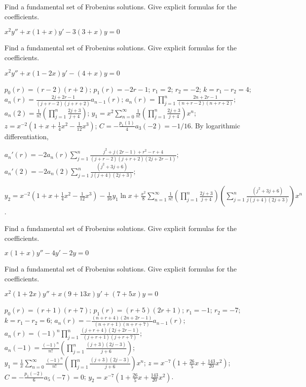 \documentclass{ximera}
\begin{document}
\begin{problem}\label{exer:7.7.11}
Find
a fundamental set  of Frobenius solutions. Give explicit formulas for
the coefficients.

$x^2y''+x(1+x)y'-3(3+x)y=0$
\end{problem}

\begin{problem}\label{exer:7.7.12}
Find
a fundamental set  of Frobenius solutions. Give explicit formulas for
the coefficients.

$x^2y''+x(1-2x)y'-(4+x)y=0$
\begin{solution}
    $p_0(r)=(r-2)(r+2)$;
$p_1(r)=-2r-1$;
$r_1=2$; $r_2=-2$; $k=r_1-r_2=4$;
$a_n(r)=\frac{2j+2r-1}{(j+r-2)(j+r+2)}
a_{n-1}(r)$;
 $a_n(r)=\prod_{j=1}^n\frac{2n+2r-1}{(n+r-2)(n+r+2)}$;
$a_n(2)=\frac{1}{ n!}\left(\prod_{j=1}^n\frac{2j+3}{ j+4}\right)$;
$y_1=x^2\sum_{n=0}^\infty\frac{1}{ n!}\left(\prod_{j=1}^n\frac{2j+3}{
j+4}\right)x^n$;
$z=x^{-2}\left(1+x+\frac{1}{4}x^2-\frac{1}{12}x^3\right)$;
$C=-\frac{p_1(1)}{ 4}a_3(-2)=-1/16$.
By logarithmic differentiation,

$a_n'(r)=-2a_n(r)\sum_{j=1}^n
\frac{j^2+j(2r-1)+r^2-r+4}{(j+r-2)(j+r+2)(2j+2r-1)}$;
$a_n'(2)=-2a_n(2)\sum_{j=1}^n\frac{(j^2+3j+6)}{
j(j+4)(2j+3)}$;

$y_2=x^{-2}\left(1+x+\frac{1}{4}x^2-\frac{1}{12}x^3\right)-\frac{1}{16}
y_1\ln x+ \frac{x^2}{8}\sum_{n=1}^\infty\frac{1}{
n!}\left(\prod_{j=1}^n\frac{2j+3}{ j+4}
\right)\left(\sum_{j=1}^n\frac{(j^2+3j+6)}{ j(j+4)(2j+3)}\right)x^n$.
\end{solution}
\end{problem}


\begin{problem}\label{exer:7.7.13}
Find
a fundamental set  of Frobenius solutions. Give explicit formulas for
the coefficients.

$x(1+x)y''-4y'-2y=0$
\end{problem}

\begin{problem}\label{exer:7.7.14}
Find
a fundamental set  of Frobenius solutions. Give explicit formulas for
the coefficients.

$x^2(1+2x)y''+x(9+13x)y'+(7+5x)y=0$
\begin{solution}
    $p_0(r)=(r+1)(r+7)$;
$p_1(r)=(r+5)(2r+1)$;
$r_1=-1$; $r_2=-7$; $k=r_1-r_2=6$;
$a_n(r)=-\frac{(n+r+4)(2n+2r-1)}{(n+r+1)(n+r+7)} a_{n-1}(r)$;
 $a_n(r)=(-1)^n\prod_{j=1}^n
\frac{(j+r+4)(2j+2r-1)}{(j+r+1)(j+r+7)}$;
$a_n(-1)=
\frac{(-1)^n}{
n!}\left(\prod_{j=1}^n\frac{(j+3)(2j-3)}{ j+6}\right)$;
$y_1=\frac{1}{ x}\sum_{n=0}^\infty\frac{(-1)^n}{
n!}\left(\prod_{j=1}^n\frac{(j+3)(2j-3)}{ j+6}\right)x^n$;
$z=x^{-7}\left(1+\frac{26}{5}x+\frac{143}{20}x^2\right)$;
$C=-\frac{p_1(-2)}{ 6}a_5(-7)=0$;
$y_2=x^{-7}\left(1+\frac{26}{5}x+\frac{143}{20}x^2\right)$.
\end{solution}
\end{problem}
\end{document}
